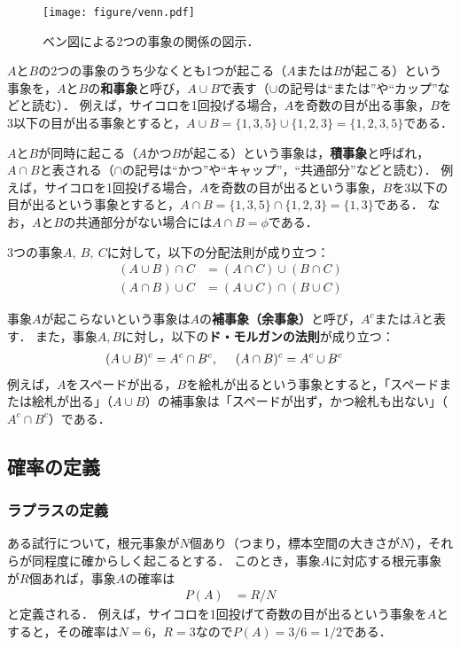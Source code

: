 %
\begin{figure}[H]
	\centering
	\texttt{[image: figure/venn.pdf]}
	\caption{ベン図による2つの事象の関係の図示．}
	\label{fig:venn}
\end{figure}
%

%
$ A $と$ B $の2つの事象のうち少なくとも1つが起こる（$ A $または$ B $が起こる）という事象を，$ A $と$ B $の\textbf{和事象}と呼び，$ A \cup B $で表す（$ \cup $の記号は``または''や``カップ''などと読む）．
%
例えば，サイコロを1回投げる場合，$ A $を奇数の目が出る事象，$ B $を3以下の目が出る事象とすると，$ A\cup B = \{1,3,5\} \cup \{1,2,3\} = \{1,2,3,5\} $である．
%

%
$ A $と$ B $が同時に起こる（$ A $かつ$ B $が起こる）という事象は，\textbf{積事象}と呼ばれ，$ A\cap B $と表される（$ \cap $の記号は``かつ''や``キャップ''，``共通部分''などと読む）．
%
例えば，サイコロを1回投げる場合，$ A $を奇数の目が出るという事象，$ B $を3以下の目が出るという事象とすると，$ A\cap B = \{1,3,5\} \cap \{1,2,3\} = \{1,3\} $である．
%
なお，$ A $と$ B $の共通部分がない場合には$ A \cap B = \phi $である．
%

%
3つの事象$ A,\ B,\ C $に対して，以下の分配法則が成り立つ：
%
\begin{align*}
	(A\cup B) \cap C &= (A\cap C) \cup (B\cap C) \\
	(A\cap B) \cup C &= (A\cup C) \cap (B\cup C)
\end{align*}
%

%
事象$ A $が起こらないという事象は$ A $の\textbf{補事象（余事象）}と呼び，$ A^{c} $または$ \bar{A} $と表す．
%
また，事象$ A, B $に対し，以下の\textbf{ド・モルガンの法則}が成り立つ：
%
\begin{align*}
	(A\cup B)^{c} &= A^{c} \cap B^{c}, \hspace{0.5cm} (A\cap B)^{c} = A^{c} \cup B^{c}
\end{align*}
%
例えば，$ A $をスペードが出る，$ B $を絵札が出るという事象とすると，「スペードまたは絵札が出る」（$ A \cup B $）の補事象は「スペードが出ず，かつ絵札も出ない」（$ A^{c} \cap B^{c} $）である．
%

\subsection{確率の定義}

\subsubsection*{ラプラスの定義}
%
ある試行について，根元事象が$ N $個あり（つまり，標本空間の大きさが$ N $），それらが同程度に確からしく起こるとする．
%
このとき，事象$ A $に対応する根元事象が$ R $個あれば，事象$ A $の確率は
%
\begin{align*}
	P(A) &= R/N
\end{align*}
%
と定義される．
%
例えば，サイコロを1回投げて奇数の目が出るという事象を$ A $とすると，その確率は$ N=6 $，$ R=3 $なので$ P(A)=3/6=1/2 $である．
%

